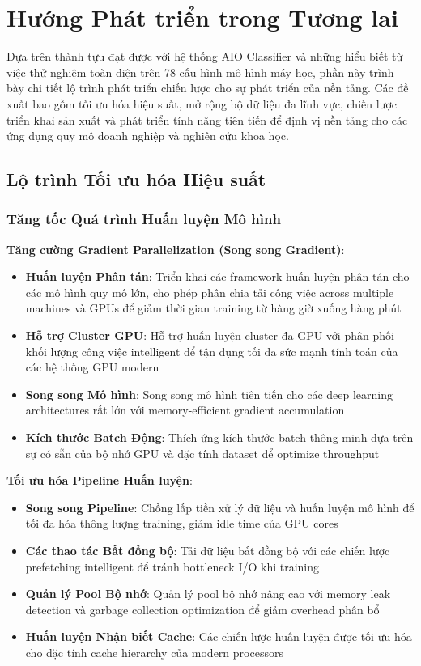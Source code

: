 \section{Hướng Phát triển trong Tương lai}\label{sec:future-development}

\noindent
Dựa trên thành tựu đạt được với hệ thống AIO Classifier và những hiểu biết từ việc thử nghiệm toàn diện trên 78 cấu hình mô hình máy học, phần này trình bày chi tiết lộ trình phát triển chiến lược cho sự phát triển của nền tảng. Các đề xuất bao gồm tối ưu hóa hiệu suất, mở rộng bộ dữ liệu đa lĩnh vực, chiến lược triển khai sản xuất và phát triển tính năng tiên tiến để định vị nền tảng cho các ứng dụng quy mô doanh nghiệp và nghiên cứu khoa học.

\subsection{Lộ trình Tối ưu hóa Hiệu suất}\label{subsec:performance-roadmap}

\subsubsection{Tăng tốc Quá trình Huấn luyện Mô hình}

\textbf{Tăng cường Gradient Parallelization (Song song Gradient)}:
\begin{itemize}
    \item \textbf{Huấn luyện Phân tán}: Triển khai các framework huấn luyện phân tán cho các mô hình quy mô lớn, cho phép phân chia tải công việc across multiple machines và GPUs để giảm thời gian training từ hàng giờ xuống hàng phút
    \item \textbf{Hỗ trợ Cluster GPU}: Hỗ trợ huấn luyện cluster đa-GPU với phân phối khối lượng công việc intelligent để tận dụng tối đa sức mạnh tính toán của các hệ thống GPU modern
    \item \textbf{Song song Mô hình}: Song song mô hình tiên tiến cho các deep learning architectures rất lớn với memory-efficient gradient accumulation
    \item \textbf{Kích thước Batch Động}: Thích ứng kích thước batch thông minh dựa trên sự có sẵn của bộ nhớ GPU và đặc tính dataset để optimize throughput
\end{itemize}

\textbf{Tối ưu hóa Pipeline Huấn luyện}:
\begin{itemize}
    \item \textbf{Song song Pipeline}: Chồng lấp tiền xử lý dữ liệu và huấn luyện mô hình để tối đa hóa thông lượng training, giảm idle time của GPU cores
    \item \textbf{Các thao tác Bất đồng bộ}: Tải dữ liệu bất đồng bộ với các chiến lược prefetching intelligent để tránh bottleneck I/O khi training
    \item \textbf{Quản lý Pool Bộ nhớ}: Quản lý pool bộ nhớ nâng cao với memory leak detection và garbage collection optimization để giảm overhead phân bổ
    \item \textbf{Huấn luyện Nhận biết Cache}: Các chiến lược huấn luyện được tối ưu hóa cho đặc tính cache hierarchy của modern processors
\end{itemize}

